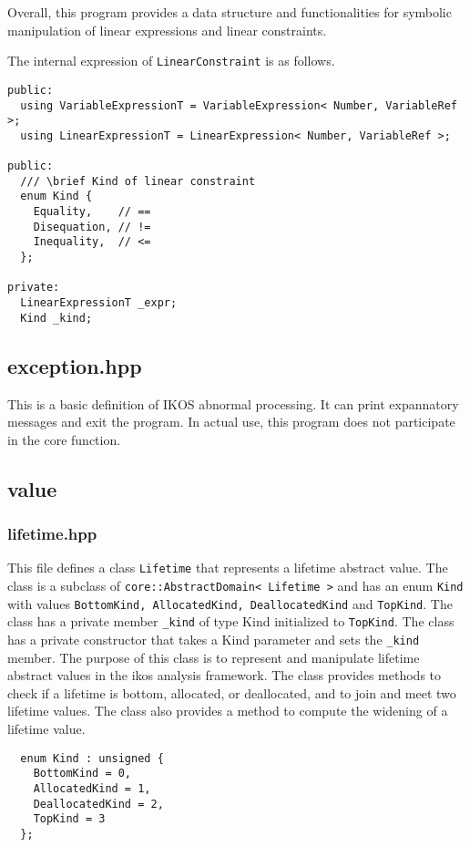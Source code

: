 \documentclass[12pt]{article}
\begin{document}
Overall, this program provides a data structure and functionalities for symbolic manipulation of linear expressions and linear constraints.

The internal expression of \texttt{LinearConstraint} is as follows.
\begin{lstlisting}
public:
  using VariableExpressionT = VariableExpression< Number, VariableRef >;
  using LinearExpressionT = LinearExpression< Number, VariableRef >;

public:
  /// \brief Kind of linear constraint
  enum Kind {
    Equality,    // ==
    Disequation, // !=
    Inequality,  // <=
  };

private:
  LinearExpressionT _expr;
  Kind _kind;
\end{lstlisting}


\subsection{exception.hpp}

This is a basic definition of IKOS abnormal processing. It can print expannatory messages and exit the program. In actual use, this program does not participate in the core function.

\subsection{value}
\subsubsection{lifetime.hpp}
This file defines a class \texttt{Lifetime} that represents a lifetime abstract value. The class is a subclass of \texttt{core::AbstractDomain< Lifetime >} and has an enum \texttt{Kind} with values \texttt{BottomKind, AllocatedKind, DeallocatedKind} and \texttt{TopKind}. The class has a private member \texttt{\_kind} of type Kind initialized to \texttt{TopKind}. The class has a private constructor that takes a Kind parameter and sets the \texttt{\_kind} member. The purpose of this class is to represent and manipulate lifetime abstract values in the ikos analysis framework. The class provides methods to check if a lifetime is bottom, allocated, or deallocated, and to join and meet two lifetime values. The class also provides a method to compute the widening of a lifetime value.
\begin{lstlisting}
  enum Kind : unsigned {
    BottomKind = 0,
    AllocatedKind = 1,
    DeallocatedKind = 2,
    TopKind = 3
  };
\end{lstlisting}
\end{document}
